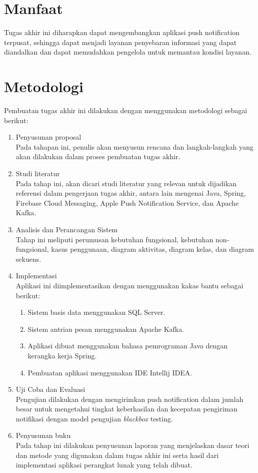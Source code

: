 \section{Manfaat}
Tugas akhir ini diharapkan dapat mengembangkan aplikasi push notification terpusat, sehingga dapat menjadi layanan penyebaran informasi yang dapat diandalkan dan dapat memudahkan pengelola untuk memantau kondisi layanan.

\section {Metodologi}
Pembuatan tugas akhir ini dilakukan dengan menggunakan metodologi sebagai berikut:
\begin{enumerate}
\item Penyusunan proposal\\
Pada tahapan ini, penulis akan menyusun rencana dan langkah-langkah yang akan dilakukan dalam proses pembuatan tugas akhir.
\item Studi literatur\\
Pada tahap ini, akan dicari studi literatur yang relevan untuk dijadikan referensi dalam pengerjaan tugas akhir, antara lain mengenai Java, Spring, Firebase Cloud Messaging, Apple Push Notification Service, dan Apache Kafka.
\item Analisis dan Perancangan Sistem\\
Tahap ini meliputi perumusan kebutuhan fungsional, kebutuhan non-fungsional, kasus penggunaan, diagram aktivitas, diagram kelas, dan diagram sekuens.
\item Implementasi\\
Aplikasi ini diimplementasikan dengan menggunakan kakas bantu sebagai berikut:
\begin{enumerate}
\item Sistem basis data menggunakan SQL Server.
\item Sistem antrian pesan menggunakan Apache Kafka.
\item Aplikasi dibuat menggunakan bahasa pemrograman Java dengan kerangka kerja Spring.
\item Pembuatan aplikasi menggunakan IDE Intellij IDEA.
\end{enumerate}
\item Uji Coba dan Evaluasi\\
Pengujian dilakukan dengan mengirimkan push notification dalam jumlah besar untuk mengetahui tingkat keberhasilan dan kecepatan pengiriman notifikasi dengan model pengujian \textit{blackbox} testing.
\item Penyusunan buku\\
Pada tahap ini dilakukan penyusunan laporan yang menjelaskan dasar teori dan metode yang digunakan dalam tugas akhir ini serta hasil dari implementasi aplikasi perangkat lunak yang telah dibuat.
\end{enumerate}

